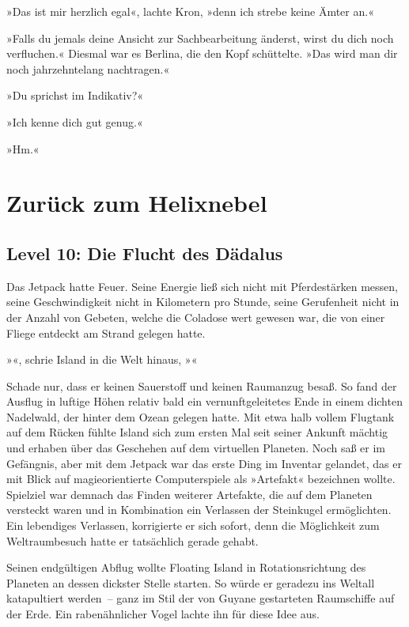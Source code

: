 »Das ist mir herzlich egal«, lachte Kron, »denn ich strebe keine Ämter an.«

»Falls du jemals deine Ansicht zur Sachbearbeitung änderst, wirst du dich noch verfluchen.« Diesmal war es Berlina, die den Kopf schüttelte. »Das wird man dir noch jahrzehntelang nachtragen.«

»Du sprichst im Indikativ?«

»Ich kenne dich gut genug.«

»Hm.«


\chapter{Zurück zum Helixnebel}

\section{Level 10: Die Flucht des Dädalus}

Das Jetpack hatte Feuer. Seine Energie ließ sich nicht mit Pferdestärken messen, seine Geschwindigkeit nicht in Kilometern pro Stunde, seine Gerufenheit nicht in der Anzahl von Gebeten, welche die Coladose wert gewesen war, die von einer Fliege entdeckt am Strand gelegen hatte.

»«, schrie Island in die Welt hinaus, »«

Schade nur, dass er keinen Sauerstoff und keinen Raumanzug besaß. So fand der Ausflug in luftige Höhen relativ bald ein vernunftgeleitetes Ende in einem dichten Nadelwald, der hinter dem Ozean gelegen hatte. Mit etwa halb vollem Flugtank auf dem Rücken fühlte Island sich zum ersten Mal seit seiner Ankunft mächtig und erhaben über das Geschehen auf dem virtuellen Planeten. Noch saß er im Gefängnis, aber mit dem Jetpack war das erste Ding im Inventar gelandet, das er mit Blick auf magieorientierte Computerspiele als »Artefakt« bezeichnen wollte. Spielziel war demnach das Finden weiterer Artefakte, die auf dem Planeten versteckt waren und in Kombination ein Verlassen der Steinkugel ermöglichten. Ein lebendiges Verlassen, korrigierte er sich sofort, denn die Möglichkeit zum Weltraumbesuch hatte er tatsächlich gerade gehabt.

Seinen endgültigen Abflug wollte Floating Island in Rotationsrichtung des Planeten an dessen dickster Stelle starten. So würde er geradezu ins Weltall katapultiert werden~– ganz im Stil der von Guyane gestarteten Raumschiffe auf der Erde. Ein rabenähnlicher Vogel lachte ihn für diese Idee aus.

